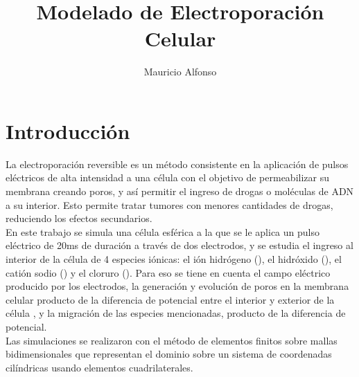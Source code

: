 \documentclass[a4paper,10pt]{article}
\title{Modelado de Electroporación Celular}
\author{Mauricio Alfonso}
\begin{document}
\newcommand{\h}{\ce{H^+}}
\newcommand{\oh}{\ce{OH^-}}
\newcommand{\na}{\ce{Na^+}}
\newcommand{\cl}{\ce{Cl^-}}
\newcommand{\kvm}{$\si{\kilo\volt\per\metre}$}
\newcommand{\usec}{$\si{\micro\second}$}


\maketitle

%
%
%

\section{Introducción}

La electroporación reversible es un método consistente en la aplicación de pulsos eléctricos de alta intensidad a una célula con el objetivo de permeabilizar su membrana creando poros, y así permitir el ingreso de drogas o moléculas de ADN a su interior. Esto permite tratar tumores con menores cantidades de drogas, reduciendo los efectos secundarios.\\



En este trabajo se simula una célula esférica a la que se le aplica un pulso eléctrico de 20\si{\milli\second} de duración a través de dos electrodos, y se estudia el ingreso al interior de la célula de 4 especies iónicas: el ión hidrógeno (\h), el hidróxido (\oh), el catión sodio (\na) y el cloruro (\cl). Para eso se tiene en cuenta el campo eléctrico producido por los electrodos, la generación y evolución de poros en la membrana celular producto de la diferencia de potencial entre el interior y exterior de la célula , y la migración de las especies mencionadas, producto de la diferencia de potencial.\\


Las simulaciones se realizaron con el método de elementos finitos sobre mallas bidimensionales que representan el dominio sobre un sistema de coordenadas cilíndricas usando elementos cuadrilaterales.
\end{document}
